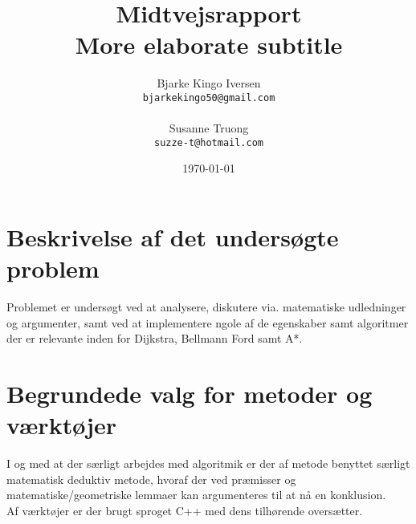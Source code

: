 \documentclass[11pt]{article}
\title{
  \vspace{3cm}
  \Huge{Midtvejsrapport} \\
  \Large{More elaborate subtitle}
}
\author{
  \Large{Bjarke Kingo Iversen}
  \\ \texttt{bjarkekingo50@gmail.com} \\\\
  \Large{Susanne Truong}
  \\ \texttt{suzze-t@hotmail.com}
}
\date{
    \today
}
\def \ColourPDF {include/ku-farve}
\def \TitlePDF   {include/ku-en}  %
\begin{document}


\clearpage\maketitle
\thispagestyle{empty}

\newpage
\section{Beskrivelse af det undersøgte problem}
Problemet er undersøgt ved at analysere, diskutere via. matematiske udledninger og argumenter, samt ved at implementere ngole af de egenskaber samt algoritmer der er relevante inden for Dijkstra, Bellmann Ford samt A*.
\section{Begrundede valg for metoder og værktøjer}
I og med at der særligt arbejdes med algoritmik er der af metode benyttet særligt matematisk deduktiv metode, hvoraf der ved præmisser og matematiske/geometriske lemmaer kan argumenteres til at nå en konklusion.\\
Af værktøjer er der brugt sproget C++ med dens tilhørende oversætter.\\
\end{document}
